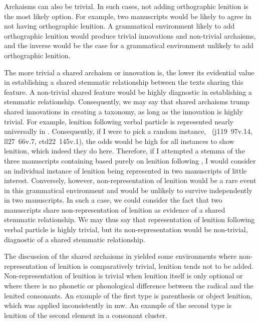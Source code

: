 Archaisms can also be trivial. In such cases, not adding orthographic lenition is the most likely option. For example, two manuscripts would be likely to agree in not having orthographic lenition. A grammatical environment likely to add orthographic lenition would produce trivial innovations and non-trivial archaisms, and the inverse would be the case for a grammatical environment unlikely to add orthographic lenition.

The more trivial a shared archaism or innovation is, the lower its evidential value in establishing a shared stemmatic relationship between the texts sharing this feature. A non-trivial shared feature would be highly diagnostic in establishing a stemmatic relationship. Consequently, we may say that shared archaisms trump shared innovations in creating a taxonomy, as long as the innovation is highly trivial.
For example, lenition following verbal particle  is represented nearly universally in . Consequently, if I were to pick a random instance, \eg {}~(\gls{j119}~97v.14, \gls{ll27}~66v.7, \gls{ctd22}~145v.1), the odds would be high for all instances to show lenition, which indeed they do here. Therefore, if I  attempted a stemma of the three manuscripts containing  based purely on lenition following , I would consider an individual instance of lenition being represented in two manuscripts of little interest. Conversely, however, non-representation of lenition would be a rare event in this grammatical environment and would be unlikely to survive independently in two manuscripts. In such a case, we could consider the fact that two manuscripts share non-representation of lenition as evidence of a shared stemmatic relationship. We may thus say that representation of lenition following verbal particle  is highly trivial, but its non-representation would be non-trivial, \ie diagnostic of a shared stemmatic relationship.

The discussion of the shared archaisms in  yielded some environments where non-representation of lenition is comparatively trivial, \ie lenition tends not to be added. Non-representation of lenition is trivial when lenition itself is only optional or where there is no phonetic or phonological difference between the radical and the lenited consonants. An example of the first type is parenthesis or object lenition, which was applied inconsistently in \gls{mw}. An example of the second type is lenition of the second element in a  consonant cluster.

